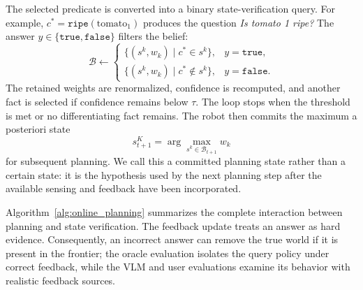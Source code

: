 The selected predicate is converted into a binary state-verification query. For example, $c^*=\texttt{ripe}(\text{tomato}_1)$ produces the question \emph{Is tomato 1 ripe?} The answer $y\in\{\texttt{true},\texttt{false}\}$ filters the belief:
\begin{equation}
\mathcal{B}
\leftarrow
\begin{cases}
\{(s^k,w_k)\mid c^*\in s^k\}, & y=\texttt{true},\\
\{(s^k,w_k)\mid c^*\notin s^k\}, & y=\texttt{false}.
\end{cases}
\label{eq:filter}
\end{equation}
The retained weights are renormalized, confidence is recomputed, and another fact is selected if confidence remains below $\tau$. The loop stops when the threshold is met or no differentiating fact remains. The robot then commits the maximum a posteriori state
\[
s_{t+1}^{K}
=
\arg\max_{s^k\in\mathcal{B}_{t+1}}w_k
\]
for subsequent planning. We call this a committed planning state rather than a certain state: it is the hypothesis used by the next planning step after the available sensing and feedback have been incorporated.

Algorithm~\ref{alg:online_planning} summarizes the complete interaction between planning and state verification. The feedback update treats an answer as hard evidence. Consequently, an incorrect answer can remove the true world if it is present in the frontier; the oracle evaluation isolates the query policy under correct feedback, while the VLM and user evaluations examine its behavior with realistic feedback sources.

